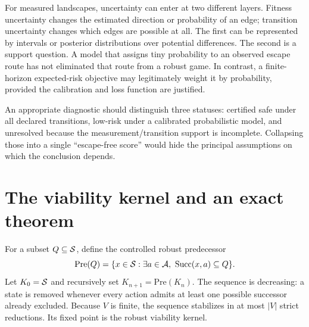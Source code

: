 \documentclass[11pt]{article}
\theoremstyle{definition}\newtheorem{definition}[proposition]{Definition}\theoremstyle{remark}\newtheorem{remark}[proposition]{Remark}
\begin{document}
For measured landscapes, uncertainty can enter at two different layers. Fitness uncertainty changes the estimated direction or probability of an edge; transition uncertainty changes which edges are possible at all. The first can be represented by intervals or posterior distributions over potential differences. The second is a support question. A model that assigns tiny probability to an observed escape route has not eliminated that route from a robust game. In contrast, a finite-horizon expected-risk objective may legitimately weight it by probability, provided the calibration and loss function are justified.

An appropriate diagnostic should distinguish three statuses: certified safe under all declared transitions, low-risk under a calibrated probabilistic model, and unresolved because the measurement/transition support is incomplete. Collapsing those into a single “escape-free score” would hide the principal assumptions on which the conclusion depends.

\section{The viability kernel and an exact theorem}
For a subset $Q\subseteq\mathcal{S}$, define the controlled robust predecessor
\begin{equation}\label{eq:pre}\mathrm{Pre}(Q)=\{x\in\mathcal{S}:\exists a\in\mathcal{A},\ \mathrm{Succ}(x,a)\subseteq Q\}.\end{equation}
Let $K_0=\mathcal{S}$ and recursively set $K_{n+1}=\mathrm{Pre}(K_n)$. The sequence is decreasing: a state is removed whenever every action admits at least one possible successor already excluded. Because $V$ is finite, the sequence stabilizes in at most $|V|$ strict reductions. Its fixed point is the robust viability kernel.
\end{document}
